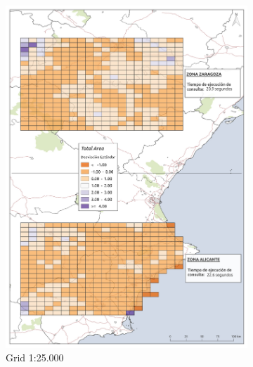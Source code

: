 \begin{figure}
  \centering
  \begin{subfigure}[b]{0.4\textwidth}
    \includegraphics[width=\textwidth]{ResultadosyDiscusion/Figs/Results/l_25.pdf}
    \caption{Grid 1:25.000}
    \label{fig:l_25}   
  \end{subfigure}             
  \begin{subfigure}[b]{0.4\textwidth}

\end{subfigure}
\end{figure}
